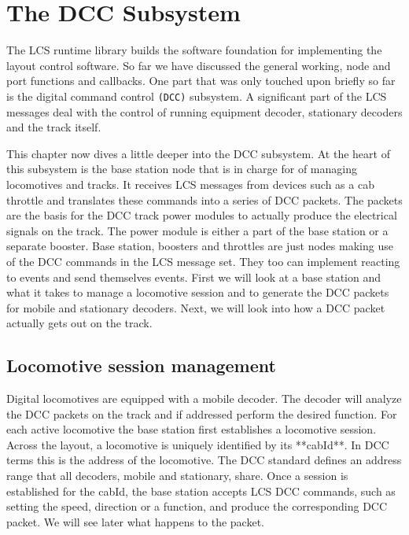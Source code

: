 \chapter{The DCC Subsystem}

The LCS runtime library builds the software foundation for implementing the layout control software. So far we have discussed the general working, node and port functions and callbacks. One part that was only touched upon briefly so far is the digital command control \texttt{(DCC)} subsystem. A significant part of the LCS messages deal with the control of running equipment decoder, stationary decoders and the track itself.

This chapter now dives a little deeper into the DCC subsystem. At the heart of this subsystem is the base station node that is in charge for of managing locomotives and tracks. It receives LCS messages from devices such as a cab throttle and translates these commands into a series of DCC packets. The packets are the basis for the DCC track power modules to actually produce the electrical signals on the track. The power module is either a part of the base station or a separate booster. Base station, boosters and throttles are just nodes making use of the DCC commands in the LCS message set. They too can implement reacting to events and send themselves events. First we will look at a base station and what it takes to manage a locomotive session and to generate the DCC packets for mobile and stationary decoders. Next, we will look into how a DCC packet actually gets out on the track.

\section{Locomotive session management}

Digital locomotives are equipped with a mobile decoder. The decoder will analyze the DCC packets on the track and if addressed perform the desired function. For each active locomotive the base station first establishes a locomotive session. Across the layout, a locomotive is uniquely identified by its **cabId**. In DCC terms this is the address of the locomotive. The DCC standard defines an address range that all decoders, mobile and stationary, share. Once a session is established for the cabId, the base station accepts LCS DCC commands, such as setting the speed, direction or a function, and produce the corresponding DCC packet. We will see later what happens to the packet.

